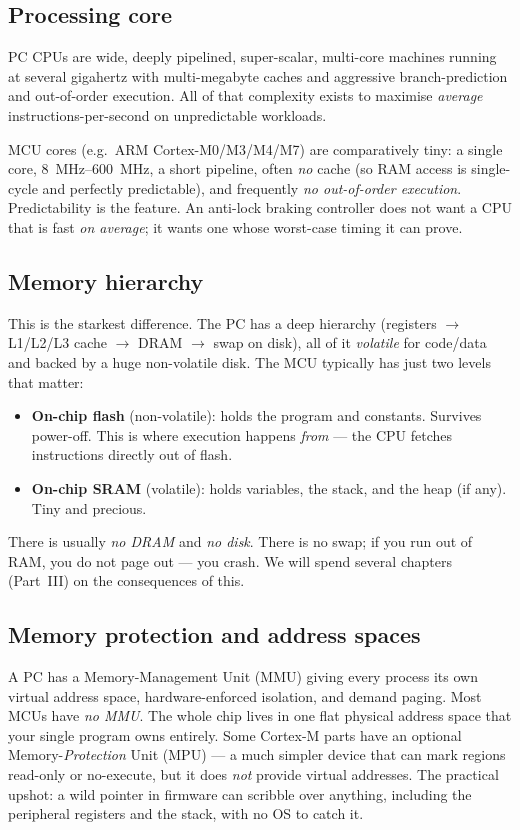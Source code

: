 \documentclass[11pt,a4paper,oneside]{book}
\begin{document}
\subsection{Processing core}
PC CPUs are wide, deeply pipelined, super-scalar, multi-core machines running
at several gigahertz with multi-megabyte caches and aggressive
branch-prediction and out-of-order execution. All of that complexity exists to
maximise \emph{average} instructions-per-second on unpredictable workloads.

MCU cores (e.g.\ ARM Cortex-M0/M3/M4/M7) are comparatively tiny: a single core,
\qtyrange{8}{600}{\mega\hertz}, a short pipeline, often \emph{no} cache (so RAM
access is single-cycle and perfectly predictable), and frequently \emph{no
out-of-order execution}. Predictability is the feature. An anti-lock braking
controller does not want a CPU that is fast \emph{on average}; it wants one
whose worst-case timing it can prove.

\subsection{Memory hierarchy}
This is the starkest difference. The PC has a deep hierarchy
(registers $\to$ L1/L2/L3 cache $\to$ DRAM $\to$ swap on disk), all of it
\emph{volatile} for code/data and backed by a huge non-volatile disk. The MCU
typically has just two levels that matter:

\begin{itemize}[leftmargin=1.4cm]
  \item \textbf{On-chip flash} (non-volatile): holds the program and constants.
        Survives power-off. This is where execution happens \emph{from} ---
        the CPU fetches instructions directly out of flash.
  \item \textbf{On-chip SRAM} (volatile): holds variables, the stack, and the
        heap (if any). Tiny and precious.
\end{itemize}

There is usually \emph{no DRAM} and \emph{no disk}. There is no swap; if you
run out of RAM, you do not page out --- you crash. We will spend several
chapters (Part~III) on the consequences of this.

\subsection{Memory protection and address spaces}
A PC has a Memory-Management Unit (MMU) giving every process its own virtual
address space, hardware-enforced isolation, and demand paging. Most MCUs have
\emph{no MMU}. The whole chip lives in one flat physical address space that
your single program owns entirely. Some Cortex-M parts have an optional
Memory-\emph{Protection} Unit (MPU) --- a much simpler device that can mark
regions read-only or no-execute, but it does \emph{not} provide virtual
addresses. The practical upshot: a wild pointer in firmware can scribble over
anything, including the peripheral registers and the stack, with no OS to catch
it.
\end{document}
